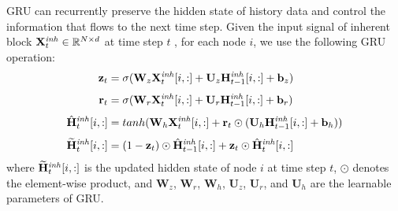 \documentclass[sigconf, nonacm]{acmart}
\def\bb#1{\mathbb{#1}}
\def\b#1{\mathbf{#1}}
\begin{document}
GRU can recurrently preserve the hidden state of history data and control the information that flows to the next time step.
Given the input signal of {\color{black}inherent block} $\b{X}^{\mathit{\color{black}inh}}_t\in\bb{R}^{N\times d}$ at time step $t$ , for each node $i$, we use the following GRU operation:
\begin{equation}
    \begin{aligned}
         \mathbf{z}_t&=\sigma(\mathbf{W}_z\mathbf{X}^{\mathit{\color{black}inh}}_t[i,:]+\mathbf{U}_z\mathbf{H}^{\mathit{\color{black}inh}}_{t-1}[i,:]+\mathbf{b}_z)\\[1.2mm]
         \mathbf{r}_t&=\sigma(\mathbf{W}_r\mathbf{X}^{\mathit{\color{black}inh}}_t[i,:]+\mathbf{U}_r\mathbf{H}^{\mathit{\color{black}inh}}_{t-1}[i,:]+\mathbf{b}_r)\\[1.2mm]
         \hat{\mathbf{H}}^{\mathit{\color{black}inh}}_{t}[i,:]&=tanh(\mathbf{W}_h\mathbf{X}^{\mathit{\color{black}inh}}_t[i, :] +\mathbf{r}_t\odot(\mathbf{U}_h\mathbf{H}^{\mathit{\color{black}inh}}_{t-1}[i, :]+\mathbf{b}_h))\\[1.2mm]
         \widetilde{\mathbf{H}}^{\mathit{\color{black}inh}}_{t}[i,:]&=(1-\mathbf{z}_t)\odot\hat{\mathbf{H}}^{\mathit{\color{black}inh}}_{t-1}[i,:]+\mathbf{z}_t\odot\hat{\mathbf{H}}^{\mathit{\color{black}inh}}_t[i,:]
    \end{aligned}
\end{equation}
where $\widetilde{\mathbf{H}}^{\mathit{\color{black}inh}}_{t}[i, :]$ is the updated hidden state of node $i$ at time step $t$, $\odot$ denotes the element-wise product, and $\b{W}_z$, $\b{W}_r$, $\b{W}_h$, $\b{U}_z$, $\b{U}_r$, and $\b{U}_h$ are the learnable parameters of GRU. 
\end{document}
